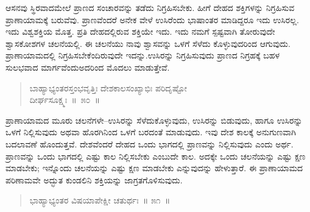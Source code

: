 \vspace{-0.25cm}


\vspace{0.1cm}

ಆಸನವು ಸ್ಥಿರವಾದಮೇಲೆ ಪ್ರಾಣದ ಸಂಚಾರವನ್ನು ತಡೆದು ನಿಗ್ರಹಿಸಬೇಕು. ಹೀಗೆ ದೇಹದ ಶಕ್ತಿಗಳನ್ನು ನಿಗ್ರಹಿಸುವ ಪ್ರಾಣಾಯಾಮಕ್ಕೆ ಬರುವೆವು. ಪ್ರಾಣವೆಂದರೆ ಅನೇಕ ವೇಳೆ ಉಸಿರೆಂದು ಭಾಷಾಂತರ ಮಾಡಿದ್ದರೂ ಇದು ಉಸಿರಲ್ಲ. ಇದು ವಿಶ್ವಶಕ್ತಿಯ ಮೊತ್ತ. ಪ್ರತಿ ದೇಹದಲ್ಲಿರುವ ಶಕ್ತಿಯೇ ಇದು. ಇದು ನಮಗೆ ಸ್ಪಷ್ಟವಾಗಿ ತೋರುವುದೇ ಶ್ವಾಸಕೋಶಗಳ ಚಲನೆಯಲ್ಲಿ. ಈ ಚಲನೆಯು ನಾವು ಶ್ವಾಸವನ್ನು ಒಳಗೆ ಸೆಳೆದು ಕೊಳ್ಳುವುದರಿಂದ ಆಗುವುದು. ಪ್ರಾಣಾಯಾಮದಲ್ಲಿ ನಿಗ್ರಹಿಸಬೇಕೆಂದಿರುವುದೇ ಇದನ್ನು.\break ಉಸಿರನ್ನು ನಿಗ್ರಹಿಸುವುದು ಪ್ರಾಣದ ನಿಗ್ರಹಕ್ಕೆ ಬಹಳ ಸುಲಭವಾದ ಮಾರ್ಗವೆಂದು\break ಅದರಿಂದ ಮೊದಲು ಮಾಡುತ್ತೇವೆ. 

\vspace{-0.3cm}

\begin{verse}
ಬಾಹ್ಯಾಭ್ಯಂತರಸ್ತಂಭವೃತ್ತಿಃ ದೇಶಕಾಲಸಂಖ್ಯಾಭಿಃ ಪರಿದೃಷ್ಟೋ\\
\hspace{6cm} ದೀರ್ಘಸೂಕ್ಷ್ಮಃ~॥~೫೦~॥
\end{verse}

\vspace{-0.35cm}


\vspace{0.1cm}

ಪ್ರಾಣಾಯಾಮದ ಮೂರು ಚಲನೆಗಳೇ–ಉಸಿರನ್ನು ಸೆಳೆದುಕೊಳ್ಳುವುದು, ಉಸಿರನ್ನು ಬಿಡುವುದು, ಹಾಗೂ ಉಸಿರನ್ನು ಒಳಗೆ ನಿಲ್ಲಿಸುವುದು ಅಥವಾ ಹೊರಗಿನಿಂದ ಒಳಗೆ ಬರದಂತೆ ಮಾಡುವುದು. ಇವು ದೇಶ ಕಾಲಕ್ಕೆ ಅನುಗುಣವಾಗಿ ಬದಲಾವಣೆ ಹೊಂದುತ್ತವೆ. ದೇಶವೆಂದರೆ ದೇಹದ ಒಂದು ಭಾಗದಲ್ಲಿ ಪ್ರಾಣವನ್ನು ನಿಲ್ಲಿಸುವುದು ಎಂದು ಅರ್ಥ. ಪ್ರಾಣವನ್ನು ಒಂದು ಭಾಗದಲ್ಲಿ ಎಷ್ಟು ಕಾಲ ನಿಲ್ಲಿಸಬೇಕು ಎಂಬುದೇ ಕಾಲ. ಅದಕ್ಕೇ ಒಂದು ಚಲನೆಯನ್ನು ಎಷ್ಟು ಕ್ಷಣ ಮಾಡಬೇಕು; ಇನ್ನೊಂದು ಚಲನೆಯನ್ನು ಎಷ್ಟು ಕ್ಷಣ ಮಾಡಬೇಕು ಎನ್ನುವುದನ್ನು ಹೇಳುತ್ತಾರೆ. ಈ ಪ್ರಾಣಾಯಾಮದ ಪರಿಣಾಮವೇ ಅದ್ಭುತ ಕುಂಡಲಿನಿ ಶಕ್ತಿಯನ್ನು ಜಾಗ್ರತಗೊಳಿಸುವುದು. 

\vspace{-0.2cm}

\begin{verse}
ಭಾಹ್ಯಾಭ್ಯಂತರ ವಿಷಯಾಪೇಕ್ಷೀ ಚತುರ್ಥಃ~॥ ೫೧~॥
\end{verse}

\vspace{-0.4cm}


